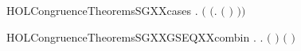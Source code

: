 \begin{SaveVerbatim}{HOLCongruenceTheoremsSGXXcases}
       \HOLSymConst{\HOLTokenExists{}} . \ensuremath{(} \HOLSymConst{\ensuremath{=}} \ensuremath{(}\HOLTokenLambda{}.  \ensuremath{(} \ensuremath{)} \ensuremath{)}\ensuremath{)} \HOLSymConst{\HOLTokenConj{}}  
\end{SaveVerbatim}
\newcommand{\HOLCongruenceTheoremsSGXXcases}{\UseVerbatim{HOLCongruenceTheoremsSGXXcases}}
\begin{SaveVerbatim}{HOLCongruenceTheoremsSGXXGSEQXXcombin}
\HOLTokenTurnstile{} \HOLSymConst{\HOLTokenForall{}}.   \HOLSymConst{\HOLTokenConj{}}   \HOLSymConst{\HOLTokenImp{}} \HOLSymConst{\HOLTokenForall{}}.   \HOLSymConst{\HOLTokenImp{}}  \ensuremath{(} \HOLConst{\HOLTokenCompose} \ensuremath{)} \HOLSymConst{\HOLTokenConj{}}  \ensuremath{(} \HOLConst{\HOLTokenCompose} \ensuremath{)}
\end{SaveVerbatim}
\newcommand{\HOLCongruenceTheoremsSGXXGSEQXXcombin}{\UseVerbatim{HOLCongruenceTheoremsSGXXGSEQXXcombin}}

